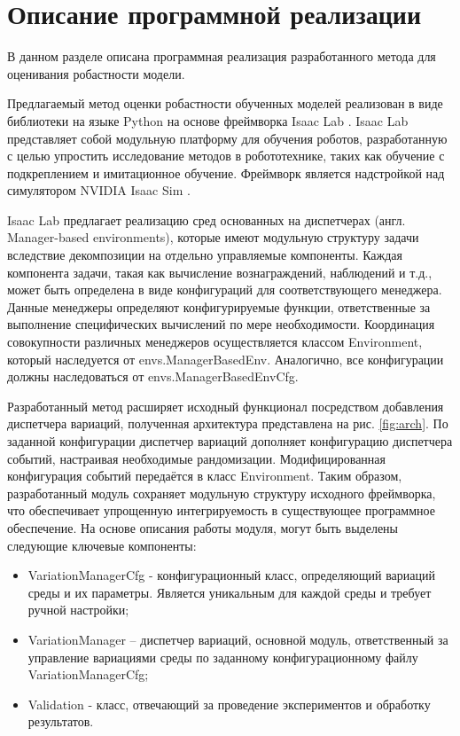     \section{Описание программной реализации}

        В данном разделе описана программная реализация разработанного метода для оценивания робастности модели. 

        Предлагаемый метод оценки робастности обученных моделей реализован в виде библиотеки на языке Python на основе фреймворка Isaac Lab \cite{isaaclab}. Isaac Lab представляет собой  модульную платформу для обучения роботов, разработанную с целью упростить исследование методов в робототехнике, таких как обучение с подкреплением и имитационное обучение. Фреймворк является надстройкой над симулятором NVIDIA Isaac Sim \cite{nvidia_isaac_sim}. 

        Isaac Lab предлагает реализацию сред основанных на диспетчерах (англ. Manager-based environments), которые имеют модульную структуру задачи вследствие декомпозиции на отдельно управляемые компоненты. Каждая компонента задачи, такая как вычисление вознаграждений, наблюдений и т.д., может быть определена в виде конфигураций для соответствующего менеджера. Данные менеджеры определяют конфигурируемые функции, ответственные за выполнение специфических вычислений по мере необходимости. Координация совокупности различных менеджеров осуществляется классом Environment, который наследуется от envs.ManagerBasedEnv. Аналогично, все конфигурации должны наследоваться от envs.ManagerBasedEnvCfg.

        Разработанный метод расширяет исходный функционал посредством добавления диспетчера вариаций, полученная архитектура представлена на рис. \ref{fig:arch}. По заданной конфигурации диспетчер вариаций 
        дополняет конфигурацию диспетчера событий, настраивая необходимые рандомизации. Модифицированная конфигурация событий передаётся в класс Environment. Таким образом, разработанный модуль сохраняет модульную структуру исходного фреймворка, что обеспечивает упрощенную интегрируемость в существующее программное обеспечение. На основе описания работы модуля, могут быть выделены следующие ключевые компоненты:
            \begin{itemize}
                \item VariationManagerCfg - конфигурационный класс, определяющий вариаций среды и их параметры. Является уникальным для каждой среды и требует ручной настройки;
                \item VariationManager – диспетчер вариаций, основной модуль, ответственный за управление вариациями среды по заданному конфигурационному файлу VariationManagerCfg;
                \item Validation - класс, отвечающий за проведение экспериментов и обработку результатов.
            \end{itemize}
        

